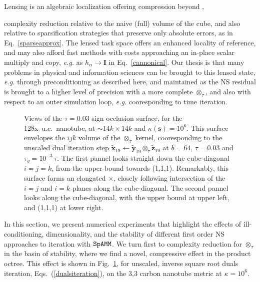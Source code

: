 \documentclass[letterpaper,twocolumn,amsmath,amsfont,amssymb,english,aps,jcp,preprintnumbers,groupaddress,nofootinbib,tightenlines,floatfix]{revtex4}
\newcommand{\mat}[1]{\boldsymbol{#1}}
\newcommand{\mmat}[1]{\widetilde{\boldsymbol{#1}}}
\newcommand{\ot}{  {\scriptstyle \otimes}_{ \tau } }
\theoremstyle{plain}
\theoremstyle{remark}
\theoremstyle{plain}
\begin{document}
Lensing is an algebraic localization offering compression beyond  , 

complexity reduction relative to the naive (full) volume of the cube,
and also relative to sparsification strategies that preserve only absolute errors, as in Eq.~\ref{sparseapprox}.  
The lensed task space offers an enhanced locality of reference, and may also afford fast methods 
with costs approaching an in-place scalar multiply and copy, {\em e.g.} as $h_\alpha \rightarrow \mat{I}$ in Eq.~\ref{cannonical}.
Our thesis is that many problems in physical and information sciences can be brought to this lensed state, {\em e.g.} through preconditioning
as described here, and maintained as the NS residual is brought to a higher level of precision with a more complete $\ot$, 
and also with respect to an outer simulation loop, {\em e.g.} cooresponding to time iteration.

 \begin{figure}[h] \label{markofzorro}
 \caption{Views of the $\tau =0.03$ sign occlusion surface, for the 
 128x~u.c.~nanotube, at $\sim {14k \times 14k}$ and $\kappa(\mat{s})=10^6$. 
 This surface envelopes the $ijk$ volume of the $\ot$ kernel,  
 cooresponding to the unscaled dual iteration step $\mmat{x}_{19} \leftarrow \mmat{y}_{19} \ot \mmat{z}_{19} $ at $b=64$, $\tau=0.03$ and
 $\tau_y=10^{-3} \, \tau $.  The first pannel looks straight down the cube-diagonal $i=j=k$, from the upper bound towards (1,1,1).
 Remarkably, this surface forms an elongated $\times$, closely following intersection of the $i=j$  and $i=k$ planes 
 along the cube-diagonal. The second pannel looks along the cube-diagonal, with the upper bound at upper left, and (1,1,1) at lower right.}
 \end{figure}

In this section, we present  numerical experiments that highlight the effects of 
ill-conditioning, dimensionality, and the stability of different first order NS approaches to iteration with $\tt SpAMM$. 
We turn first to complexity reduction for $\ot$ in the basin of stability,  where we find a novel, compressive 
effect in the product octree.  This effect is shown in Fig.~\ref{markofzorro},  
for unscaled, inverse square root duals iteration, Eqs.~(\ref{dualsiteration}), on the 3,3 carbon 
nanotube metric at $\kappa=10^6$.  
\end{document}
